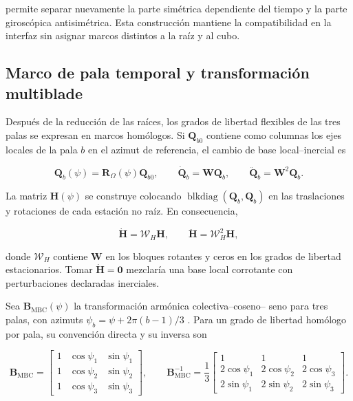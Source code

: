 permite separar nuevamente la parte simétrica dependiente del tiempo y la
parte giroscópica antisimétrica. Esta construcción mantiene la compatibilidad
en la interfaz sin asignar marcos distintos a la raíz y al cubo.

\subsection{Marco de pala temporal y transformación multiblade}
\label{prefgyro:mbc}

Después de la reducción de las raíces, los grados de libertad flexibles de las
tres palas se expresan en marcos homólogos. Si $\bm Q_{b0}$ contiene como
columnas los ejes locales de la pala $b$ en el azimut de referencia, el cambio
de base local--inercial es

\begin{equation}
 \bm Q_b(\psi)=\bm R_\Omega(\psi)\bm Q_{b0},
 \qquad
 \dot{\bm Q}_b=\bm W\bm Q_b,
 \qquad
 \ddot{\bm Q}_b=\bm W^2\bm Q_b.
 \label{prefgyro:Qblade}
\end{equation}

La matriz $\bm H(\psi)$ se construye colocando
$\operatorname{blkdiag}(\bm Q_b,\bm Q_b)$ en las traslaciones y rotaciones de
cada estación no raíz. En consecuencia,

\begin{equation}
 \dot{\bm H}=\bm{\mathcal W}_H\bm H,
 \qquad
 \ddot{\bm H}=\bm{\mathcal W}_H^2\bm H,
 \label{prefgyro:Htemporal}
\end{equation}

donde $\bm{\mathcal W}_H$ contiene $\bm W$ en los bloques rotantes y ceros en
los grados de libertad estacionarios. Tomar $\dot{\bm H}=\bm 0$ mezclaría una
base local corrotante con perturbaciones declaradas inerciales.

Sea $\bm B_{\mathrm{MBC}}(\psi)$ la transformación armónica colectiva--coseno--
seno para tres palas, con azimuts
$\psi_b=\psi+2\pi(b-1)/3$ \citep{bir2008}. Para un grado de libertad homólogo
por pala, su convención directa y su inversa son

\begin{equation}
 \bm B_{\mathrm{MBC}}=
 \begin{bmatrix}
 1&\cos\psi_1&\sin\psi_1\\
 1&\cos\psi_2&\sin\psi_2\\
 1&\cos\psi_3&\sin\psi_3
 \end{bmatrix},
 \qquad
 \bm B_{\mathrm{MBC}}^{-1}=\frac13
 \begin{bmatrix}
 1&1&1\\
 2\cos\psi_1&2\cos\psi_2&2\cos\psi_3\\
 2\sin\psi_1&2\sin\psi_2&2\sin\psi_3
 \end{bmatrix}.
 \label{prefgyro:Bmbc}
\end{equation}

